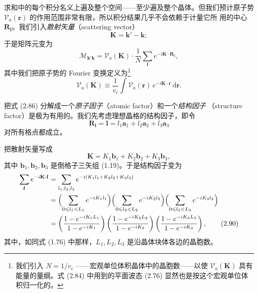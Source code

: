 求和中的每个积分名义上遍及整个空间——至少遍及整个晶体。但我们预计原子势
$\mathcal{V}_a(\mathbf{r})$ 的作用范围非常有限，所以积分结果几乎不会依赖于计量它所
用的中心 $\mathbf{R}_{\boldsymbol{l}}$。我们引入\emph{散射矢量}（scattering vector）
\begin{equation*}
\mathbf{K} = \mathbf{k}' - \mathbf{k};
\tag{2.85}
\end{equation*}
于是矩阵元变为
\begin{equation*}
\mathcal{M}_{\mathbf{k}'\mathbf{k}} = \mathcal{V}_a(\mathbf{K}) \cdot
\frac{1}{N} \sum_{\boldsymbol{l}} e^{-i\mathbf{K}\cdot\mathbf{R}_{\boldsymbol{l}}},
\tag{2.86}
\end{equation*}
其中我们把原子势的 Fourier 变换定义为\footnote{我们引入 $N = 1/v_c$
——宏观单位体积晶体中的晶胞数——以使 $\mathcal{V}_a(\mathbf{K})$
具有能量的量纲。式 (2.84) 中用到的平面波态 (2.76)
显然也是按这个宏观单位体积归一化的。}
\begin{equation*}
\mathcal{V}_a(\mathbf{K}) \equiv \frac{1}{v_c} \int
\mathcal{V}_a(\mathbf{r})\, e^{-i\mathbf{K}\cdot\mathbf{r}}\, \mathrm{d}\mathbf{r}.
\tag{2.87}
\end{equation*}

把式 (2.86) 分解成一个\emph{原子因子}（atomic factor）和一个\emph{结构因子}
（structure factor）是极为有用的。我们先考虑理想晶格的结构因子，即令
\begin{equation*}
\mathbf{R}_{\boldsymbol{l}} = \boldsymbol{l}
= l_1\mathbf{a}_1 + l_2\mathbf{a}_2 + l_3\mathbf{a}_3
\tag{2.88}
\end{equation*}
对所有格点都成立。

把散射矢量写成
\begin{equation*}
\mathbf{K} = K_1\mathbf{b}_1 + K_2\mathbf{b}_2 + K_3\mathbf{b}_3,
\tag{2.89}
\end{equation*}
其中 $\mathbf{b}_1, \mathbf{b}_2, \mathbf{b}_3$
是倒格子三矢组 (1.19)。于是结构因子变为
\begin{align*}
\sum_{\boldsymbol{l}} e^{-i\mathbf{K}\cdot\boldsymbol{l}}
&= \sum_{l_1,l_2,l_3} e^{-i(K_1 l_1 + K_2 l_2 + K_3 l_3)} \\
&= \Bigl( \sum_{0 \leqslant l_1 < L_1} e^{-iK_1 l_1} \Bigr)
   \Bigl( \sum_{0 \leqslant l_2 < L_2} e^{-iK_2 l_2} \Bigr)
   \Bigl( \sum_{0 \leqslant l_3 < L_3} e^{-iK_3 l_3} \Bigr) \\
&= \left( \frac{1 - e^{-iK_1 L_1}}{1 - e^{-iK_1}} \right)
   \left( \frac{1 - e^{-iK_2 L_2}}{1 - e^{-iK_2}} \right)
   \left( \frac{1 - e^{-iK_3 L_3}}{1 - e^{-iK_3}} \right),
\tag{2.90}
\end{align*}
其中，如同式 (1.76) 中那样，$L_1, L_2, L_3$
是沿晶体块体各边的晶胞数。

